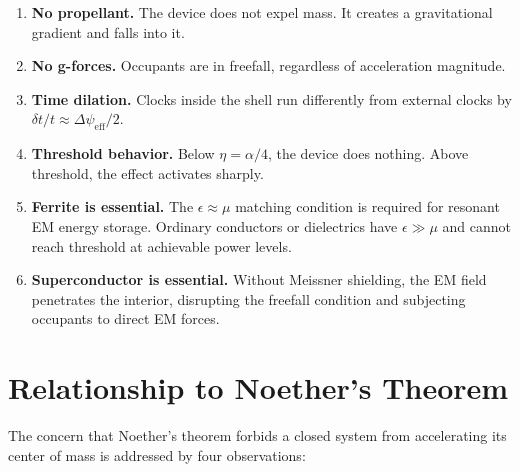 \documentclass[12pt, letterpaper]{article}
\theoremstyle{definition}
\theoremstyle{remark}
\begin{document}
\begin{enumerate}
\item \textbf{No propellant.} The device does not expel mass. It creates
a gravitational gradient and falls into it.

\item \textbf{No g-forces.} Occupants are in freefall, regardless of
acceleration magnitude.

\item \textbf{Time dilation.} Clocks inside the shell run differently from
external clocks by $\delta t/t \approx \Delta\psi_{\mathrm{eff}}/2$.

\item \textbf{Threshold behavior.} Below $\eta = \alpha/4$, the device
does nothing. Above threshold, the effect activates sharply.

\item \textbf{Ferrite is essential.} The $\epsilon \approx \mu$ matching
condition is required for resonant EM energy storage. Ordinary conductors
or dielectrics have $\epsilon \gg \mu$ and cannot reach threshold at
achievable power levels.

\item \textbf{Superconductor is essential.} Without Meissner shielding,
the EM field penetrates the interior, disrupting the freefall condition
and subjecting occupants to direct EM forces.
\end{enumerate}

\section{Relationship to Noether's Theorem}
\label{sec:noether}

The concern that Noether's theorem forbids a closed system from
accelerating its center of mass is addressed by four observations:
\end{document}
